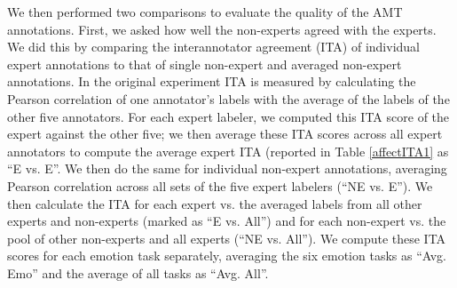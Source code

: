 \documentclass[11pt]{article}
\begin{document}
%


%


We then performed two comparisons to evaluate the quality of the AMT annotations.
First, we  asked how well the non-experts agreed with the experts.
We did this by comparing the interannotator agreement (ITA) of
individual expert annotations to that of single non-expert and
averaged non-expert annotations.  In the original experiment ITA
is measured by calculating the Pearson correlation of one annotator's
labels with the average of the labels of the other five annotators. For each expert labeler, we computed this ITA score of the expert against the other five;
we then average these ITA scores across all expert annotators to compute the average expert ITA  (reported in Table \ref{affectITA1} as ``E vs. E''.   We then do the same for individual non-expert annotations, averaging Pearson correlation across all sets of the five expert labelers (``NE vs. E'').  We then calculate the ITA for each expert vs. the averaged labels from all other experts and non-experts (marked as ``E vs. All'') and for each non-expert vs. the pool of other non-experts and all experts (``NE vs. All'').  We compute these ITA scores for each emotion task separately, averaging the six emotion tasks as ``Avg. Emo'' and the average of all tasks as ``Avg. All''.
\end{document}
